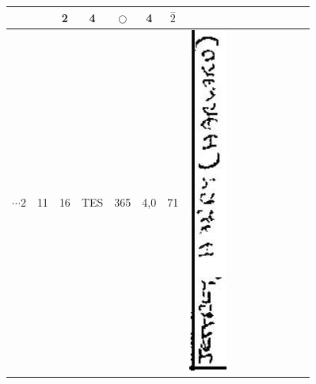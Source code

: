 \documentclass[10pt]{article}
\begin{document}
\begin{center}
\begin{tabular}{|c|c|c|c|c|c|c|c|c|c|c|c|c|c|c|}
 &  & 2 & 4 & \(\bigcirc\) & 4 & \(\stackrel{-}{2}\) \\
\hline
\(\cdots 2\) & 11 & 16 & TES & 365 & 4,0 & 71 & \includegraphics[max width=\textwidth]{2025_02_27_dd68c3d38de88f0516d9g-009(1)}

\end{tabular}
\end{center}
\end{document}
